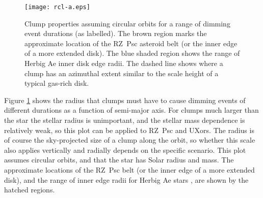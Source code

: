 \documentclass[]{rsos}
\begin{document}

\begin{figure}
  \begin{center}
    \hspace{-0.5cm} \texttt{[image: rcl-a.eps]}
    \caption{Clump properties assuming circular orbits for a range of dimming event
      durations (as labelled). The brown region marks the approximate location of the
      RZ~Psc asteroid belt (or the inner edge of a more extended disk). The blue shaded
      region shows the range of Herbig Ae inner disk edge radii. The dashed line shows
      where a clump has an azimuthal extent similar to the scale height of a typical
      gas-rich disk.}\label{fig:rcla}
  \end{center}
\end{figure}

Figure \ref{fig:rcla} shows the radius that clumps must have to cause dimming events of
different durations as a function of semi-major axis. For clumps much larger than the
star the stellar radius is unimportant, and the stellar mass dependence is relatively
weak, so this plot can be applied to RZ~Psc and UXors. The radius is of course the
sky-projected size of a clump along the orbit, so whether this scale also applies
vertically and radially depends on the specific scenario. This plot assumes circular
orbits, and that the star has Solar radius and mass. The approximate locations of the
RZ~Psc belt (or the inner edge of a more extended disk), and the range of inner edge
radii for Herbig Ae stars \cite{2007prpl.conf..539M}, are shown by the hatched regions.
\end{document}
